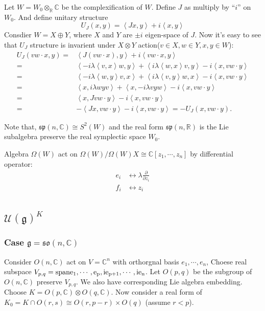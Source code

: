 \documentclass[12pt]{article}
\def\bR{{\mathbb{R}}}
\def\bC{{\mathbb{C}}}
\def\sspan{\rm{span}}
\def\sp{{\mathfrak{sp}}}
\def\inn#1#2{\left\langle{#1},{#2}\right\rangle}
\def\aso{\mathfrak{so}}
\def\fgg{\mathfrak{g}}
\def\cuu{\mathcal{U}}
\begin{document}
Let $W=W_0\otimes_\bR\bC$ be the complexification of $W$. 
Define $J$ as multiply by ``$i$'' on $W_0$. And define unitary structure
\[
U_J(x,y) = \inn{Jx}{y} + i\inn{x}{y}
\]
Consdier $W = X\oplus Y$, where $X$ and $Y$ are $\pm i$ eigen-space of $J$. 
Now it's easy to see that $U_J$ structure is 
invarient under $X\otimes Y$ action($v\in X, w\in Y, x,y\in W$):
\[
\begin{split}
U_J(vw\cdot x,y) =& \inn{J(vw\cdot x)}{y} + i\inn{vw\cdot x}{y}\\
=&\inn{-i\lambda\inn{v}{x} w}{y}
+\inn{i\lambda\inn{w}{x} v}{y}
 - i \inn{x}{vw\cdot y}\\
=& \inn{-i\lambda\inn{w}{y}v}{x}
+ \inn{i\lambda \inn{v}{y}w}{x}
-i\inn{x}{vw\cdot y}\\
=& \inn{x}{i\lambda{w}{y}v}
+ \inn{x}{-i\lambda{v}{y}w}
-i\inn{x}{vw\cdot y}\\
=& \inn{x}{J vw\cdot y} -i\inn{x}{vw\cdot y}\\
=& -\inn{Jx}{vw\cdot y}  -i\inn{x}{vw\cdot y}= -U_J(x,vw\cdot y).
\end{split}
\]

Note that, $\sp(n,\bC)\cong S^2(W)$ and the real form $\sp(n,\bR)$ is the 
Lie subalgebra preserve the real symplectic space $W_0$. 



Algebra $\Omega(W)$ act on $\Omega(W)/\Omega(W)X \cong \bC[z_1, \cdots,z_n]$ by differential operator:
\begin{align*}
e_i &\leftrightarrow \lambda \frac{\partial}{\partial z_i}\\
f_i &\leftrightarrow z_i\\
\end{align*}

\subsection{$\cuu(\fgg)^K$}
\subsubsection{Case $\fgg=\aso(n,\bC)$} 
Consider $O(n,\bC)$ act on $V=\bC^n$ with orthorgnal basis $e_1, \cdots, e_n$, 
Choese real subspace $V_{p,q} = \sspan{e_1, \cdots, e_p, ie_{p+1},\cdots, ie_n}$.
Let $O(p,q)$ be the subgroup of $O(n,\bC)$ preserve $V_{p,q}$. We also have corresponding Lie algebra embedding. 
Choose $K = O(p,\bC)\otimes O(q,\bC)$. Now consider a real form of 
$K_0 = K\cap O(r,s) \cong O(r,p-r)\times O(q)$ (assume $r<p$).
\end{document}
